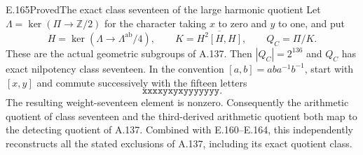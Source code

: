 \begin{result}{E.165}{Proved}{The exact class seventeen of the large harmonic quotient}
Let $\Lambda=\ker(\Pi\to\mathbb Z/2)$ for the character
taking $x$ to zero and $y$ to one, and put
\[
 H=\ker(\Lambda\to\Lambda^{\mathrm{ab}}/4),\qquad
 K=\overline{H^2[H,H]},\qquad Q_C=\Pi/K.
\]
These are the actual geometric subgroups of A.137.
Then $|Q_C|=2^{136}$ and $Q_C$ has exact nilpotency class
seventeen.  In the convention $[a,b]=aba^{-1}b^{-1}$,
start with $[x,y]$ and commute successively with the fifteen
letters
\[
                  \texttt{xxxxyxyxyyyyyyy}.
\tag{E.165.1}
\]
The resulting weight-seventeen element is nonzero.
Consequently the arithmetic quotient of class seventeen
and the third-derived arithmetic quotient both map to
the detecting quotient of A.137.  Combined with E.160--E.164,
this independently reconstructs all the stated exclusions
of A.137, including its exact quotient class.
\end{result}
